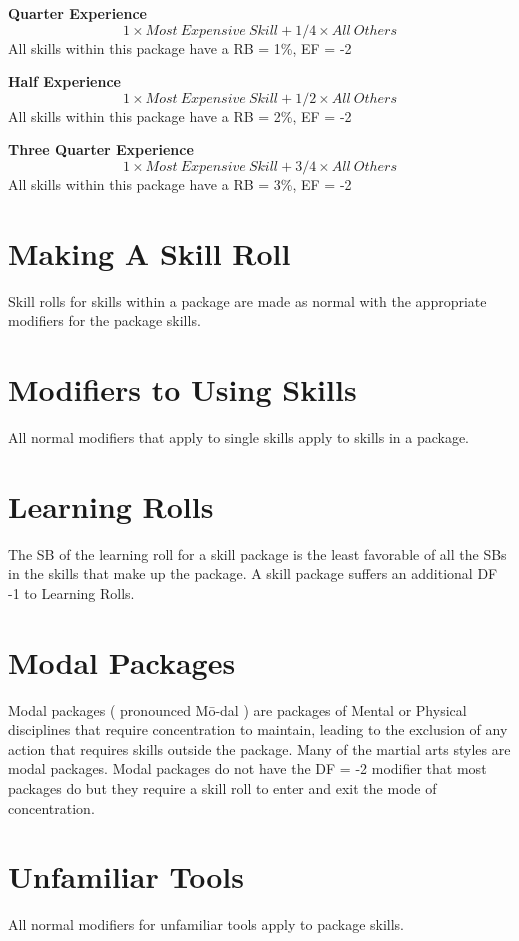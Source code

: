 {\bf Quarter Experience}
\[ 1 \times Most\ Expensive\ Skill + 1/4 \times All\ Others \]
All skills within this package have a RB = 1\%, EF = -2

{\bf Half Experience }
\[ 1 \times Most\ Expensive\ Skill + 1/2 \times All\ Others \]
All skills within this package have a RB = 2\%, EF = -2

{\bf Three Quarter Experience}
\[ 1 \times Most\ Expensive\ Skill + 3/4 \times All\ Others \]
All skills within this package have a RB = 3\%, EF = -2

\section{Making A Skill Roll}

Skill rolls for skills within a package are made as normal with the
appropriate modifiers for the package skills.

\section{Modifiers to Using Skills}
All normal modifiers that apply to single skills apply to skills in a package.

\section{Learning Rolls}
The SB of the learning roll for a skill package is the least favorable
of all the SBs in the skills that make up the package. A skill package
suffers an additional DF -1 to Learning Rolls.

\section{Modal Packages}

Modal packages ( pronounced M\=o-dal ) are packages of Mental or Physical disciplines
that require concentration to maintain, leading to the exclusion of any action that
requires skills outside the package. Many of the martial arts styles are modal
packages.  Modal packages do not have the DF = -2 modifier that most packages do
but they require a skill roll to enter and exit the mode of concentration.

\section{Unfamiliar Tools}
All normal modifiers for unfamiliar tools apply to package skills.

